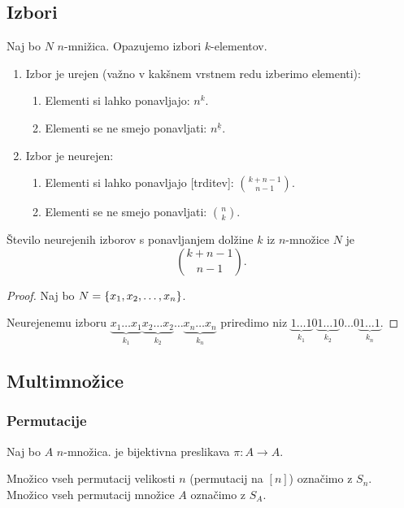 \subsection{Izbori}
Naj bo $N$ $n$-mnižica. Opazujemo izbori $k$-elementov.
\begin{enumerate}
    \item Izbor je urejen (važno v kakšnem vrstnem redu izberimo elementi):
    \begin{enumerate}
        \item Elementi si lahko ponavljajo: $n^k$.
        \item Elementi se ne smejo ponavljati: $n^{\underline{k}}$.
    \end{enumerate}
    \item Izbor je neurejen:
    \begin{enumerate}
        \item Elementi si lahko ponavljajo [trditev]: $\binom{k + n- 1}{n-1}$.
        \item Elementi se ne smejo ponavljati: $\binom{n}{k}$.
    \end{enumerate}
\end{enumerate}

\begin{trditev}
    Število neurejenih izborov s ponavljanjem dolžine $k$ iz $n$-množice $N$ je 
    $$\binom{k+n-1}{n-1}.$$
\end{trditev}

\begin{proof}
    Naj bo $N = \left\{x_1, x_2, \ldots, x_n\right\}$. 
    
    Neurejenemu izboru $\underbrace{x_1\ldots x_1}_{k_1} \underbrace{x_2 \ldots x_2}_{k_2} \ldots \underbrace{x_n \ldots x_n}_{k_n}$ priredimo niz $\underbrace{1 \ldots 1}_{k_1} 0 \underbrace{1 \ldots 1}_{k_2} 0 \ldots 0 \underbrace{1 \ldots 1}_{k_n}$.
\end{proof}

\subsection{Multimnožice}
\subsubsection{Permutacije}
\begin{definicija}
    Naj bo $A$ $n$-množica.  je bijektivna preslikava $\pi: A \to A$.

    Množico vseh permutacij velikosti $n$ (permutacij na $[n]$) označimo z $S_n$. 
    Množico vseh permutacij množice $A$ označimo z $S_A$.
\end{definicija}

